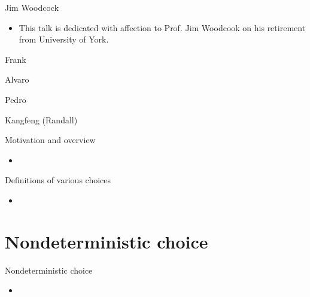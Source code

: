 \documentclass[%
    slidestop,%
    compress,%
    mathserif,%
    table,%
    usenames,%
    aspectratio=169,
    dvipsnames,%
]{beamer}%
\begin{document}
\begin{frame}{Jim Woodcock}
    \begin{itemize}
        \item This talk is dedicated with affection to Prof. Jim Woodcook on his retirement from University of York.
    \end{itemize}

    
    \begin{block}{Frank}

    \end{block}
    \begin{block}{Alvaro}

    \end{block}
    \begin{block}{Pedro}

    \end{block}
    \begin{block}{Kangfeng (Randall)}

    \end{block}
\end{frame}


\begin{frame}{Motivation and overview}
    \begin{itemize}
        \item 
    \end{itemize}
\end{frame}

\begin{frame}{Definitions of various choices}
    \begin{itemize}
        \item 
    \end{itemize}
\end{frame}

\section{Nondeterministic choice}
\begin{frame}{Nondeterministic choice}
    \begin{itemize}
        \item 
    \end{itemize}
\end{frame}
\end{document}
